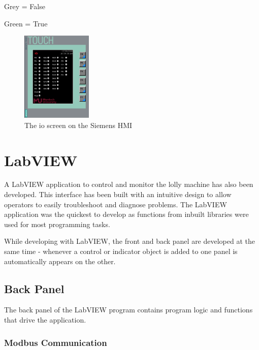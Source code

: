             \begin{description}
                \item Grey = False
                \item Green = True
            \end{description}

        \begin{figure}[H]
            \centering
            \includegraphics[width = 0.3\textwidth]{2_images/hmiIo}
            \caption{The io screen on the Siemens HMI}
            \label{fig:hmiIo}
        \end{figure} 
    
\section{LabVIEW}
    A LabVIEW application to control and monitor the lolly machine has also been developed. This interface has been built with an intuitive design to allow operators to easily troubleshoot and diagnose problems. The LabVIEW application was the quickest to develop as functions from inbuilt libraries were used for most programming tasks.

    While developing with LabVIEW, the front and back panel are developed at the same time - whenever a control or indicator object is added to one panel is automatically appears on the other.
    
    \subsection{Back Panel}
    
        The back panel of the LabVIEW program contains program logic and functions that drive the application. 
        
        \subsubsection{Modbus Communication}
        

